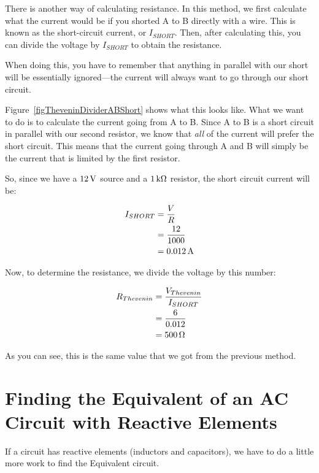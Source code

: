 There is another way of calculating \thev resistance.  
In this method, we first calculate what the current would be if you shorted A to B directly with a wire.
This is known as the short-circuit current, or $I_{SHORT}$.
Then, after calculating this, you can divide the \thev voltage by $I_{SHORT}$ to obtain the \thev resistance.

When doing this, you have to remember that anything in parallel with our short will be essentially ignored---the current will always want to go through our short circuit.


Figure~\ref{figTheveninDividerABShort} shows what this looks like.
What we want to do is to calculate the current going from A to B.
Since A to B is a short circuit in parallel with our second resistor, we know that \emph{all} of the current will prefer the short circuit.
This means that the current going through A and B will simply be the current that is limited by the first resistor.

So, since we have a $12\,\si{\volt}$ source and a $1\,\si{\kilo\ohm}$ resistor, the short circuit current will be:

\begin{align*}
I_{SHORT} &= \frac{V}{R} \\
          &= \frac{12}{1000} \\
          &= 0.012\,\si{\ampere}
\end{align*}

Now, to determine the \thev resistance, we divide the \thev voltage by this number:

\begin{align*}
R_{Thevenin} &= \frac{V_{Thevenin}}{I_{SHORT}} \\
  &= \frac{6}{0.012} \\
  &= 500\,\si{\ohm}
\end{align*}

As you can see, this is the same value that we got from the previous method.


\section{Finding the \thev Equivalent of an AC Circuit with Reactive Elements}

If a circuit has reactive elements (inductors and capacitors), we have to do a little more work to find the \thev Equivalent circuit.

